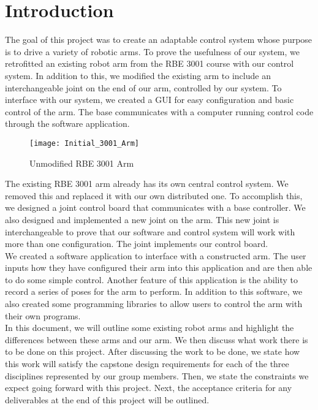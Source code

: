 \section{Introduction} 


The goal of this project was to create an adaptable control system whose purpose is to drive a variety of robotic arms. To prove the usefulness of our system, we retrofitted an existing robot arm from the RBE 3001 course with our control system.  In addition to this, we modified the existing arm to include an interchangeable joint on the end of our arm, controlled by our system. To interface with our system, we created a GUI for easy configuration and basic control of the arm. The base communicates with a computer running control code through the software application. \\
\newline

\begin{figure}[H]
\centering
\texttt{[image: Initial\_3001\_Arm]}
\caption{Unmodified RBE 3001 Arm}
\label{fig:Functional_Block_Diagram}
\end{figure}


The existing RBE 3001 arm already has its own central control system. We removed this and replaced it with our own distributed one. To accomplish this, we designed a joint control board that communicates with a base controller.  We also designed and implemented a new joint on the arm. This new joint is interchangeable to prove that our software and control system will work with more than one configuration. The joint implements our control board. \\



We created a software application to interface with a constructed arm. The user inputs how they have configured their arm into this application and are then able to do some simple control. Another feature of this application is the ability to record a series of poses for the arm to perform. In addition to this software, we also created some programming libraries to allow users to control the arm with their own programs. \\
\newline
In this document, we will outline some existing robot arms and highlight the differences between these arms and our arm. We then discuss what work there is to be done on this project. After discussing the work to be done, we state how this work will satisfy the capstone design requirements for each of the three disciplines represented by our group members. Then, we state the constraints we expect going forward with this project. Next, the acceptance criteria for any deliverables at the end of this project will be outlined. 
